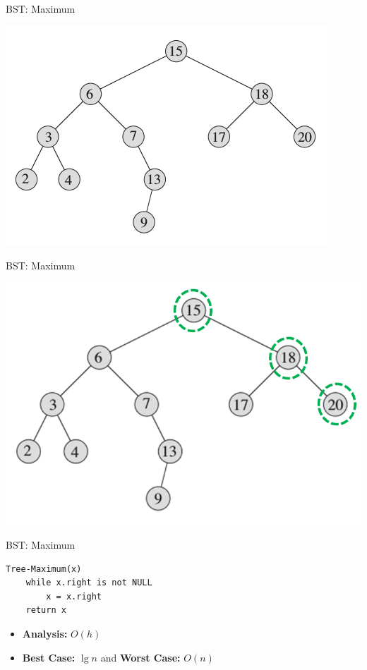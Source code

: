 \documentclass{beamer}
\begin{document}
\begin{frame}{BST: Maximum}

    \begin{center}
        \includegraphics[scale=0.6]{bstMaximum.png}
    \end{center}
\end{frame}


\begin{frame}{BST: Maximum}

    \begin{center}
        \includegraphics[scale=0.6]{bstMaximum2.png}
    \end{center}
\end{frame}

\begin{frame}[fragile]{BST: Maximum}
\begin{verbatim}
Tree-Maximum(x)
    while x.right is not NULL
        x = x.right
    return x
\end{verbatim}
    \begin{itemize}
        \item {\bf Analysis:} $O(h)$
        \item {\bf Best Case:} $\lg n$ and {\bf Worst Case:} $O(n)$
    \end{itemize}
\end{frame}
\end{document}
